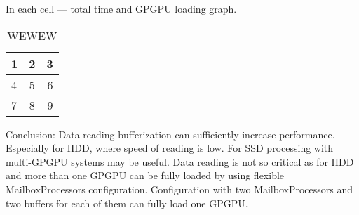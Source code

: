 In each cell  --- total time and GPGPU loading graph.

\begin{table*}[ht]
\caption{WEWEW}
\label{tbl:eval1}
\begin{center}
  \begin{tabular}{ l | c | r }
    \hline
    1 & 2 & 3 \\ \hline
    4 & 5 & 6 \\ \hline
    7 & 8 & 9 \\
    \hline
  \end{tabular}
\end{center}
\end{table*}

Conclusion:
Data reading bufferization can sufficiently increase performance.
Especially for HDD, where speed of reading is low.  
For SSD processing with multi-GPGPU systems may be useful.
Data reading is not so critical as for HDD and more than one GPGPU can be fully loaded by using flexible MailboxProcessors configuration.
Configuration with two MailboxProcessors and two buffers for each of them can fully load one GPGPU.




